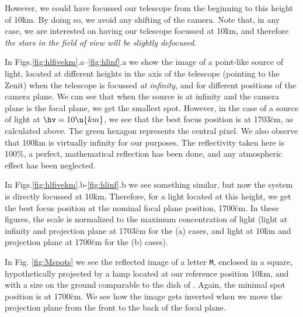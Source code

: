 However, we could have focussed our telescope from the beginning to
this height of 10\u{km}. By doing so, we avoid any shifting of the
camera. Note that, in any case, we are interested on having our
telescope focussed at 10\u{km}, and therefore \emph{the stars in the
  field of view will be slightly defocused}.

\colldeltafig

In Figs.\ref{fig:hlfivekm}.a--\ref{fig:hlinf}.a we show the image of a
point-like source of light, located at different heights \hv in the
axis of the telescope (pointing to the Zenit) when the telescope is
focussed \emph{at infinity}, and for different positions of the camera
plane. We can see that when the source is at infinity and the camera
plane is the focal plane, we get the smallest spot. However, in the
case of a source of light at $\hv=10\u{km}$, we see that the best
focus position is at 1703\u{cm}, as calculated above. The green
hexagon represents the central pixel. We also observe that 100\u{km}
is virtually infinity for our purposes. The reflectivity taken here is
100\%, a perfect, mathematical reflection has been done, and any
atmospheric effect has been neglected.

\hlfivekmfig
 
\hltenkmfig
 
\hltwelvekmfig

\hlhundredkmfig
 
\hlinffig

\Mspotsfig

\afterpage{\clearpage}

In Figs.\ref{fig:hlfivekm}.b-\ref{fig:hlinf}.b we see something
similar, but now the system is directly focussed at 10\u{km}.
Therefore, for a light located at this height, we get the best focus
position at the nominal focal plane position, 1700\u{cm}.  In these
figures, the scale is normalized to the maximum concentration of light
(light at infinity and projection plane at 1703\u{cm} for the (a)
cases, and light at 10\u{km} and projection plane at 1700\u{cm} for
the (b) cases).

In Fig. \ref{fig:Mspots} we see the reflected image of a letter
\texttt{M}, enclosed in a square, hypothetically projected by a lamp
located at our reference position 10\u{km}, and with a size on the
ground comparable to the dish of \MAGIC. Again, the minimal spot
position is at 1700\u{cm}. We see how the image gets inverted when we
move the projection plane from the front to the back of the focal
plane.

